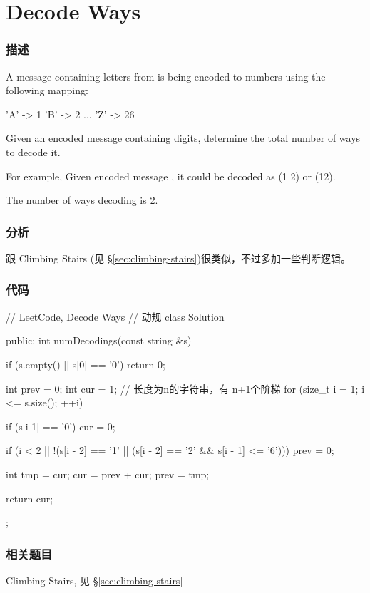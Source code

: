\section{Decode Ways} %
\label{sec:decode-ways}


\subsubsection{描述}
A message containing letters from  is being encoded to numbers using the following mapping:
\begin{Code}
'A' -> 1
'B' -> 2
...
'Z' -> 26
\end{Code}

Given an encoded message containing digits, determine the total number of ways to decode it.

For example,
Given encoded message , it could be decoded as  (1 2) or  (12).

The number of ways decoding  is 2.


\subsubsection{分析}
跟 Climbing Stairs (见 \S \ref{sec:climbing-stairs})很类似，不过多加一些判断逻辑。


\subsubsection{代码}
\begin{Code}
// LeetCode, Decode Ways
// 动规
class Solution {
public:
    int numDecodings(const string &s) {
        if (s.empty() || s[0] == '0') return 0;

        int prev = 0;
        int cur = 1;
        // 长度为n的字符串，有 n+1个阶梯
        for (size_t i = 1; i <= s.size(); ++i) {
            if (s[i-1] == '0') cur = 0;

            if (i < 2 || !(s[i - 2] == '1' ||
                     (s[i - 2] == '2' && s[i - 1] <= '6')))
                prev = 0;

            int tmp = cur;
            cur = prev + cur;
            prev = tmp;
        }
        return cur;
    }
};
\end{Code}


\subsubsection{相关题目}
\begindot
\item Climbing Stairs, 见 \S \ref{sec:climbing-stairs}
\myenddot


